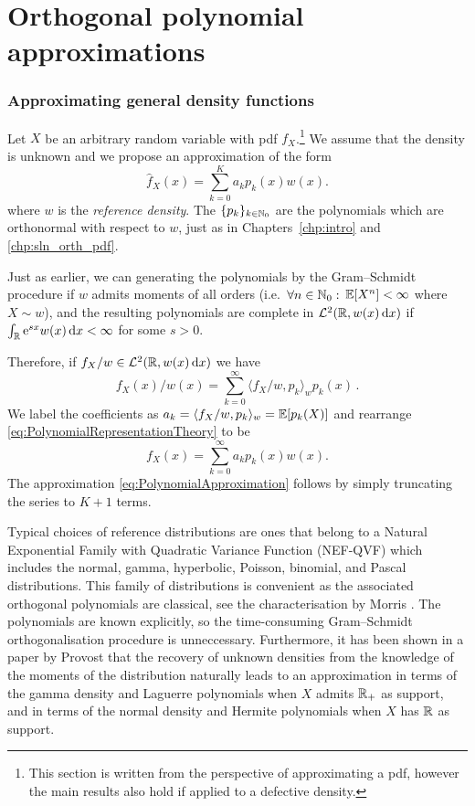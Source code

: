 \section{Orthogonal polynomial approximations}\label{sec:PolynomialApproximation}


\subsubsection{Approximating general density functions} \label{ssec:PolynomialApproxIntro}

Let $X$ be an arbitrary random variable with pdf $f_X$.\footnote{This section is written from the perspective of approximating a pdf, however the main results also hold if applied to a defective density.} We assume that the density is unknown and we propose an approximation of the form
\begin{equation}\label{eq:PolynomialApproximation}
\widehat{f}_{X}(x)=\sum_{k=0}^{K}a_{k}p_{k}(x)w(x).
\end{equation}
where $w$ is the \emph{reference density}. The $\{p_{k}\}_{k\in\mathbb{N}_0}$ are the polynomials which are orthonormal with respect to $w$, just as in Chapters~\ref{chp:intro} and \ref{chp:sln_orth_pdf}.

Just as earlier, we can generating the polynomials by the Gram--Schmidt procedure if $w$ admits moments of all orders (i.e.\ $\forall n \in \mathbb{N}_0 :$ $\operatorname{{\mathbb E}}[X^n] < \infty$ where $X \sim w$), and the resulting polynomials are complete in $\mathcal{L}^2(\mathbb{R}, w(x) \mathop{}\!\mathrm{d} x)$ if $\int_{\mathbb{R}} \mathrm{e}^{sx} w(x) \mathop{}\!\mathrm{d} x < \infty$ for some $s>0$.

Therefore, if $f_{X}/w\in \mathcal{L}^2(\mathbb{R}, w(x) \mathop{}\!\mathrm{d} x)$ we have
\begin{equation}\label{eq:PolynomialRepresentationTheory}
f_{X}(x)/w(x)=\sum_{k=0}^{\infty} \langle f_X / w, p_k \rangle_w p_k(x) \,.
\end{equation}
We label the coefficients as $a_k = \langle f_X / w, p_k \rangle_w = \operatorname{{\mathbb E}}[p_k(X)]$
and rearrange \eqref{eq:PolynomialRepresentationTheory} to be
\begin{equation}\label{eq:PolynomialRepresentation}
f_{X}(x)=\sum_{k=0}^{\infty} a_k p_{k}(x) w(x).
\end{equation}
The approximation \eqref{eq:PolynomialApproximation} follows by simply truncating the series to $K+1$ terms.

Typical choices of reference distributions are ones that belong to a Natural Exponential Family with Quadratic Variance Function (NEF-QVF) which includes the normal, gamma, hyperbolic, Poisson, binomial, and Pascal distributions.
This family of distributions is convenient as the associated orthogonal polynomials are classical, see the characterisation by Morris \cite{Mo82}. The polynomials are known explicitly, so the time-consuming Gram--Schmidt orthogonalisation procedure is unneccessary. Furthermore, it has been shown in a paper by Provost \cite{Pr05} that the recovery of unknown densities from the knowledge of the moments of the distribution naturally leads to an approximation in terms of the gamma density and Laguerre polynomials when $X$ admits $\mathbb{R}_{+}$ as support, and in terms of the normal density and Hermite polynomials when $X$ has $\mathbb{R}$ as support.

